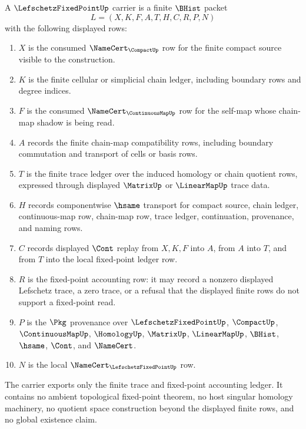 \begin{definition}
\label{def:lefschetz-fixed-point-finite-chain-carrier}
A $\LefschetzFixedPointUp$ carrier is a finite $\BHist$ packet
$$
L=(X,K,F,A,T,H,C,R,P,N)
$$
with the following displayed rows:
\begin{enumerate}
\item $X$ is the consumed $\NameCert_{\CompactUp}$ row for the finite compact source visible to the construction.
\item $K$ is the finite cellular or simplicial chain ledger, including boundary rows and degree indices.
\item $F$ is the consumed $\NameCert_{\ContinuousMapUp}$ row for the self-map whose chain-map shadow is being read.
\item $A$ records the finite chain-map compatibility rows, including boundary commutation and transport of cells or basis rows.
\item $T$ is the finite trace ledger over the induced homology or chain quotient rows, expressed through displayed $\MatrixUp$ or $\LinearMapUp$ trace data.
\item $H$ records componentwise $\hsame$ transport for compact source, chain ledger, continuous-map row, chain-map row, trace ledger, continuation, provenance, and naming rows.
\item $C$ records displayed $\Cont$ replay from $X,K,F$ into $A$, from $A$ into $T$, and from $T$ into the local fixed-point ledger row.
\item $R$ is the fixed-point accounting row: it may record a nonzero displayed Lefschetz trace, a zero trace, or a refusal that the displayed finite rows do not support a fixed-point read.
\item $P$ is the $\Pkg$ provenance over $\LefschetzFixedPointUp$, $\CompactUp$, $\ContinuousMapUp$, $\HomologyUp$, $\MatrixUp$, $\LinearMapUp$, $\BHist$, $\hsame$, $\Cont$, and $\NameCert$.
\item $N$ is the local $\NameCert_{\LefschetzFixedPointUp}$ row.
\end{enumerate}
The carrier exports only the finite trace and fixed-point accounting ledger. It contains no ambient topological fixed-point theorem, no host singular homology machinery, no quotient space construction beyond the displayed finite rows, and no global existence claim.
\end{definition}


